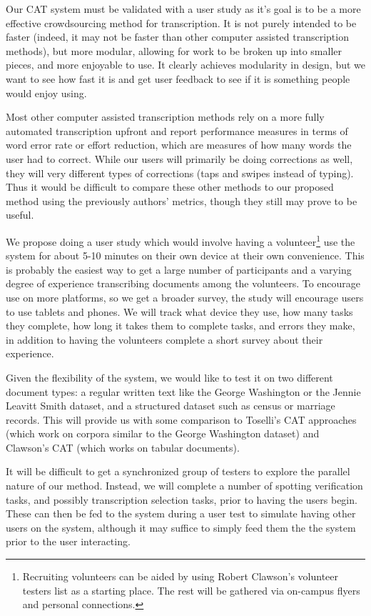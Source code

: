 \documentclass[ms]{byuprop}
\begin{document}
Our CAT system must be validated with a user study as it's goal is to be a more effective crowdsourcing method for transcription. It is not purely intended to be faster (indeed, it may not be faster than other computer assisted transcription methods), but more modular, allowing for work to be broken up into smaller pieces, and more enjoyable to use. It clearly achieves modularity in design, but we want to see how fast it is and get user feedback to see if it is something people would enjoy using.

Most other computer assisted transcription methods rely on a more fully automated transcription upfront and report performance measures in terms of word error rate or effort reduction, which are measures of how many words the user had to correct. While our users will primarily be doing corrections as well, they will very different types of corrections (taps and swipes instead of typing). Thus it would be difficult to compare these other methods to our proposed method using the previously authors' metrics, though they still may prove to be useful.

We propose doing a user study which would involve having a volunteer\footnote{Recruiting volunteers can be aided by using Robert Clawson's volunteer testers list as a starting place. The rest will be gathered via on-campus flyers and personal connections.} use the system for about 5-10 minutes on their own device at their own convenience. This is probably the easiest way to get a large number of participants and a varying degree of experience transcribing documents among the volunteers. To encourage use on more platforms, so we get a broader survey, the study will encourage users to use tablets and phones.
We will track what device they use, how many tasks they complete, how long it takes them to complete tasks, and errors they make, in addition to having the volunteers complete a short survey about their experience.

Given the flexibility of the system, we would like to test it on two different document types: a regular written text like the George Washington\cite{GW} or the Jennie Leavitt Smith\cite{Smith} dataset, and a structured dataset such as census or marriage records. This will provide us with some comparison to Toselli's CAT approaches (which work on corpora similar to the George Washington dataset) and Clawson's CAT (which works on tabular documents).

It will be difficult to get a synchronized group of testers to explore the parallel nature of our method. Instead, we will complete a number of spotting verification tasks, and possibly transcription selection tasks, prior to having the users begin. These can then be fed to the system during a user test to simulate having other users on the system, although it may suffice to simply feed them the the system prior to the user interacting.
\end{document}
